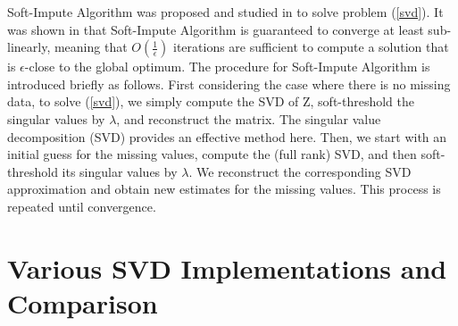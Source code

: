 \documentclass[12pt]{article}
\begin{document}
Soft-Impute Algorithm was proposed and studied in \cite{mazumder2010spectral} to solve problem (\ref{svd}). It was shown in \cite{mazumder2010spectral}  that Soft-Impute Algorithm is guaranteed to converge at least sub-linearly, meaning that $O\left(\frac{1}{\epsilon}\right)$ iterations are sufficient to 
compute a solution that is $\epsilon$-close to the global optimum.
The procedure for Soft-Impute Algorithm is introduced briefly as follows. First considering the case
where there is no missing data, to solve (\ref{svd}), we simply
compute the SVD of Z, soft-threshold the singular values by $\lambda$, and reconstruct
the matrix. The singular value decomposition (SVD) provides an effective method here. Then, we start with an initial guess for the missing values, compute
the (full rank) SVD, and then soft-threshold its singular values by $\lambda$. We reconstruct the corresponding SVD approximation and obtain new
estimates for the missing values. This process is repeated until convergence. 


\section{Various SVD Implementations and Comparison}
\end{document}
